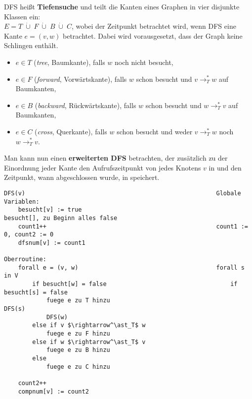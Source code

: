 DFS heißt \textbf{Tiefensuche} und teilt die Kanten eines Graphen in
vier disjunkte Klassen ein: \\
$E = T \;\dot{\cup}\; F \;\dot{\cup}\; B \;\dot{\cup}\; C$, wobei der
Zeitpunkt betrachtet wird, wenn DFS eine Kante $e = (v, w)$ betrachtet.
Dabei wird vorausgesetzt, dass der Graph keine Schlingen enthält.
\begin{itemize}
    \item $e \in T$ (\emph{tree}, Baumkante), falls $w$ noch nicht besucht,
    \item $e \in F$ (\emph{forward}, Vorwärtskante), falls $w$ schon besucht
    und $v \rightarrow^\ast_T w$ auf Baumkanten,
    \item $e \in B$ (\emph{backward}, Rückwärtskante), falls $w$ schon besucht
    und $w \rightarrow^\ast_T v$ auf Baumkanten,
    \item $e \in C$ (\emph{cross}, Querkante), falls $w$ schon besucht
    und weder $v \rightarrow^\ast_T w$ noch $w \rightarrow^\ast_T v$.
\end{itemize}

\linie

Man kann nun einen \textbf{erweiterten DFS} betrachten, der zusätzlich zu der
Einordnung jeder Kante den Aufrufszeitpunkt von  jedes Knotens
$v$ in  und den Zeitpunkt, wann  abgeschlossen
wurde, in  speichert.

\begin{lstlisting}
DFS(v)                                                      Globale Variablen:
    besucht[v] := true                                       besucht[], zu Beginn alles false
    count1++                                                count1 := 0, count2 := 0
    dfsnum[v] := count1
                                                            Oberroutine:
    forall e = (v, w)                                       forall s in V
        if besucht[w] = false                                   if besucht[s] = false
            fuege e zu T hinzu                                      DFS(s)
            DFS(w)
        else if v $\rightarrow^\ast_T$ w
            fuege e zu F hinzu
        else if w $\rightarrow^\ast_T$ v
            fuege e zu B hinzu
        else
            fuege e zu C hinzu

    count2++
    compnum[v] := count2
\end{lstlisting}

\linie
\pagebreak


